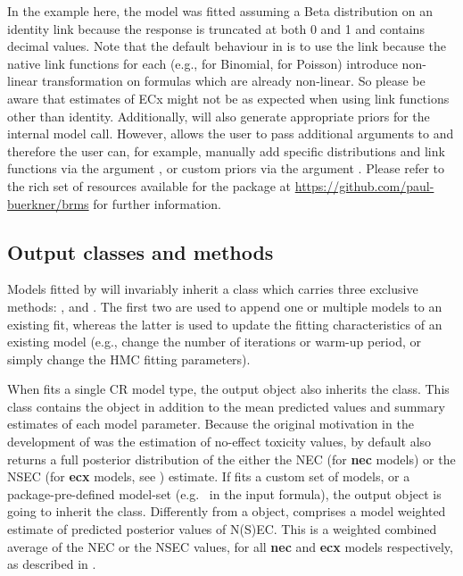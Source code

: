 \documentclass[
  shortnames]{jss}
\begin{document}
In the example here, the model was fitted assuming a Beta distribution on an identity link because the response is truncated at both 0 and 1 and contains decimal values. Note that the default behaviour in  is to use the  link because the native link functions for each  (e.g.,  for Binomial,  for Poisson) introduce non-linear transformation on formulas which are already non-linear. So please be aware that estimates of ECx might not be as expected when using link functions other than identity. Additionally,  will also generate appropriate priors for the internal  model call. However,  allows the user to pass additional arguments to  and therefore the user can, for example, manually add specific distributions and link functions via the argument , or custom priors via the argument . Please refer to the rich set of resources available for the  package at \url{https://github.com/paul-buerkner/brms} for further information.

\hypertarget{output-classes-and-methods}{%
\subsection{Output classes and methods}\label{output-classes-and-methods}}

Models fitted by  will invariably inherit a class  which carries three exclusive methods: \code{+},  and . The first two are used to append one or multiple models to an existing fit, whereas the latter is used to update the fitting characteristics of an existing model (e.g., change the number of iterations or warm-up period, or simply change the HMC fitting parameters).

When  fits a single CR model type, the output object also inherits the  class. This class contains the  object in addition to the mean predicted values and summary estimates of each model parameter. Because the original motivation in the development of  was the estimation of no-effect toxicity values, by default  also returns a full posterior distribution of the either the NEC (for \textbf{nec} models) or the NSEC (for \textbf{ecx} models, see \citet{Fisher2023}) estimate. If  fits a custom set of models, or a package-pre-defined model-set (e.g.~ in the input formula), the output object is going to inherit the  class. Differently from a  object,  comprises a model weighted estimate of predicted posterior values of N(S)EC. This is a weighted combined average of the NEC or the NSEC values, for all \textbf{nec} and \textbf{ecx} models respectively, as described in \citet{fisher2023ieam}.
\end{document}
